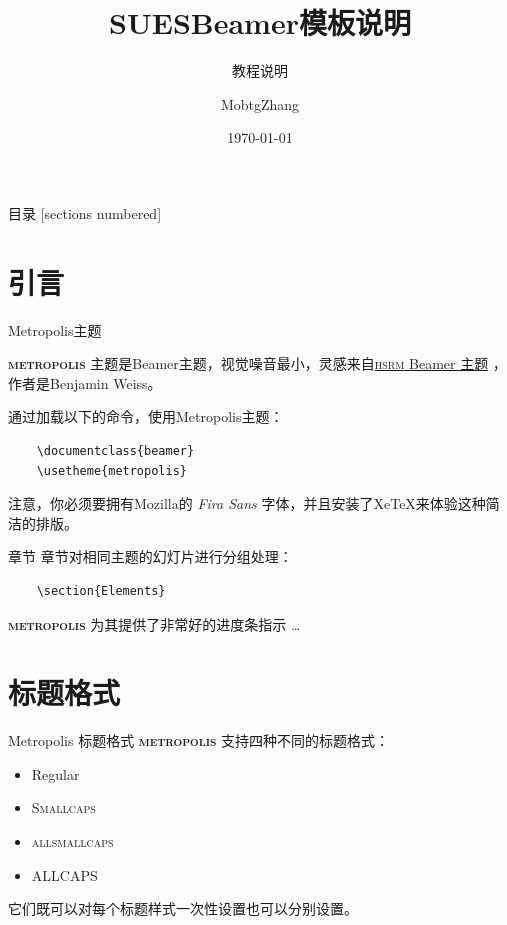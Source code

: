 \documentclass[12pt,aspectratio=169]{beamer}
\title{SUESBeamer模板说明}
\subtitle{教程说明}
\date{\today}
\author{MobtgZhang}
\institute{上海工程技术大学}
\newcommand{\themename}{\textbf{\textsc{metropolis}}\xspace}
\begin{document}
\maketitle

\begin{frame}{目录}
  [sections numbered]
  \tableofcontents%
\end{frame}

\section[引言\qquad Introduction]{引言}

\begin{frame}[fragile]{Metropolis主题}

  \themename 主题是Beamer主题，视觉噪音最小，灵感来自\href{https://github.com/hsrmbeamertheme/hsrmbeamertheme}{\textsc{hsrm} Beamer 主题} ，作者是Benjamin Weiss。

  通过加载以下的命令，使用Metropolis主题：
  
  \begin{verbatim}    \documentclass{beamer}
    \usetheme{metropolis}\end{verbatim}

  注意，你必须要拥有Mozilla的 \emph{Fira Sans} 字体，并且安装了XeTeX来体验这种简洁的排版。
\end{frame}
\begin{frame}[fragile]{章节}
  章节对相同主题的幻灯片进行分组处理：

  \begin{verbatim}    \section{Elements}\end{verbatim}

  \themename 为其提供了非常好的进度条指示 \ldots
  
\end{frame}

\section[标题格式 \qquad Titleformats]{标题格式}

\begin{frame}{Metropolis 标题格式}
	\themename 支持四种不同的标题格式：
	\begin{itemize}
		\item Regular
		\item \textsc{Smallcaps}
		\item \textsc{allsmallcaps}
		\item ALLCAPS
	\end{itemize}
  它们既可以对每个标题样式一次性设置也可以分别设置。
\end{frame}
\end{document}
